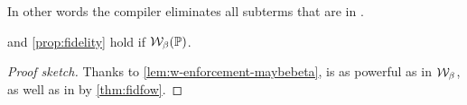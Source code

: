 In other words the compiler eliminates all subterms that are in \maybebeta.

\begin{theorem} \label{th:fidelity-beta}
   and \cref{prop:fidelity} hold if $\mathcal{W}_\beta(\mathbb{P})$.
\end{theorem}
\begin{proof}[Proof sketch] Thanks to \cref{lem:w-enforcement-maybebeta},
  \Ue is as powerful as \Uo in $\mathcal{W}_\beta$, as well as in \wellb by
  \cref{thm:fidfow}.
\end{proof}








